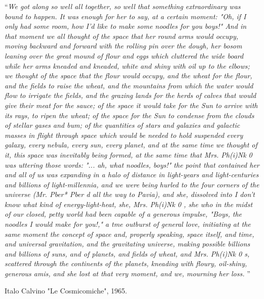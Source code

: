 \begin{acknowledgements}
\enquote{\itshape We got along so well all together, so well that something extraordinary was bound 
to happen. It was enough for her to say, at a certain moment: "Oh, if I only had some 
room, how I'd like to make some noodles for you boys!" And in that moment we all 
thought of the space that her round arms would occupy, moving backward and forward 
with the rolling pin over the dough, her bosom leaning over the great mound of flour and 
eggs which cluttered the wide board while her arms kneaded and kneaded, white and 
shiny with oil up to the elbows; we thought of the space that the flour would occupy, and 
the wheat for the flour, and the fields to raise the wheat, and the mountains from which 
the water would flow to irrigate the fields, and the grazing lands for the herds of calves 
that would give their meat for the sauce; of the space it would take for the Sun to arrive 
with its rays, to ripen the wheat; of the space for the Sun to condense from the clouds of 
stellar gases and bum; of the quantities of stars and galaxies and galactic masses in flight 
through space which would be needed to hold suspended every galaxy, every nebula, 
every sun, every planet, and at the same time we thought of it, this space was inevitably 
being formed, at the same time that Mrs. Ph(i)Nk 0 was uttering those words: "... ah, 
what noodles, boys!" the point that contained her and all of us was expanding in a halo of 
distance in light-years and light-centuries and billions of light-millennia, and we were 
being hurled to the four corners of the universe (Mr. Pber* Pber d all the way to Pavia), and 
she, dissolved into I don't know what kind of energy-light-heat, she, Mrs. Ph(i)Nk 0 , she 
who in the midst of our closed, petty world had been capable of a generous impulse, 
"Boys, the noodles I would make for you!," a tme outburst of general love, initiating at 
the same moment the concept of space and, properly speaking, space itself, and time, and 
universal gravitation, and the gravitating universe, making possible billions and billions 
of suns, and of planets, and fields of wheat, and Mrs. Ph(i)Nk 0 s, scattered through the 
continents of the planets, kneading with floury, oil-shiny, generous amis, and she lost at 
that very moment, and we, mourning her loss.  }\bigbreak


\hfill Italo Calvino "Le Cosmicomiche", 1965.
\end{acknowledgements}